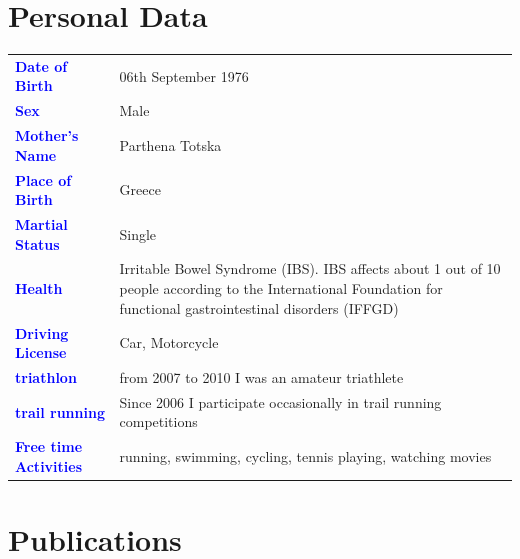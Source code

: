 \documentclass[11pt, a4paper]{awesome-cv}
\begin{document}
\pagebreak

\bigskip
\bigskip

\hypertarget{personal-data}{%
\section{Personal Data}\label{personal-data}}

\bigskip

\begin{table}[H]
\centering\begingroup\fontsize{9}{11}\selectfont

\begin{tabular}{>{}l>{\raggedright\arraybackslash}p{30em}}
\toprule
\textcolor{blue}{\textbf{Date of Birth}} & 06th  September 1976\\
\textcolor{blue}{\textbf{Sex}} & Male\\
\textcolor{blue}{\textbf{Mother’s Name}} & Parthena Totska\\
\textcolor{blue}{\textbf{Place of Birth}} & Greece\\
\textcolor{blue}{\textbf{Martial Status}} & Single\\
\addlinespace
\textcolor{blue}{\textbf{Health}} & Irritable Bowel Syndrome (IBS).  IBS affects about 1 out of 10 people according to the International Foundation for functional gastrointestinal disorders (IFFGD)\\
\textcolor{blue}{\textbf{Driving License}} & Car,  Motorcycle\\
\textcolor{blue}{\textbf{triathlon}} & from 2007 to 2010 I was an amateur triathlete\\
\textcolor{blue}{\textbf{trail running}} & Since 2006 I participate occasionally in trail running competitions\\
\textcolor{blue}{\textbf{Free time Activities}} & running, swimming, cycling, tennis playing, watching movies\\
\bottomrule
\end{tabular}
\endgroup{}
\end{table}

\bigskip
\bigskip

\hypertarget{publications}{%
\section{Publications}\label{publications}}

\begin{cventries}
    \vspace{-4.0mm}
    \vspace{-4.0mm}
    \vspace{-4.0mm}
    \vspace{-4.0mm}
\end{cventries}
\end{document}
